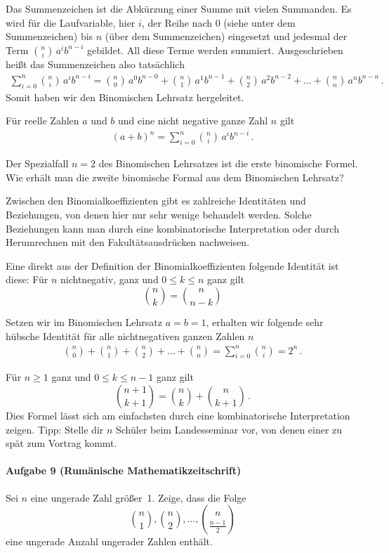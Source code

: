 \documentclass[11pt,a4paper]{article}
\begin{document}
Das Summenzeichen ist die Abkürzung einer Summe mit vielen Summanden. Es wird
für die Laufvariable, hier $i$, der Reihe nach 0 (siehe unter dem
Summenzeichen) bis $n$ (über dem Summenzeichen) eingesetzt und jedesmal der
Term $\binom{n}{i}\,a^{i}b^{n-i}$ gebildet. All diese Terme werden
summiert. Ausgeschrieben heißt das Summenzeichen also tatsächlich
\begin{gather*}
  \sum_{i=0}^{n} \binom{n}{i}\,a^{i}b^{n-i} =\binom{n}{0}\,a^{0}b^{n-0}
  +\binom{n}{1}\,a^{1}b^{n-1} +\binom{n}{2}\,a^{2}b^{n-2} +\dots
  +\binom{n}{n}\,a^{n}b^{n-n}\,.
\end{gather*}
Somit haben wir den Binomischen Lehrsatz hergeleitet.
\begin{satz}
  Für reelle Zahlen $a$ und $b$ und eine nicht negative ganze Zahl $n$
  gilt
  \begin{gather*}
    (a+b)^{n}=\sum_{i=0}^{n} \binom{n}{i}\,a^{i}b^{n-i}\,.
  \end{gather*}
\end{satz}
Der Spezialfall $n=2$ des Binomischen Lehrsatzes ist die erste binomische
Formel.  Wie erhält man die zweite binomische Formal aus dem Binomischen
Lehrsatz?

Zwischen den Binomialkoeffizienten gibt es zahlreiche Identitäten und
Beziehungen, von denen hier nur sehr wenige behandelt werden. Solche
Beziehungen kann man durch eine kombinatorische Interpretation oder durch
Herumrechnen mit den Fakultätsausdrücken nachweisen.

Eine direkt aus der Definition der Binomialkoeffizienten folgende Identität
ist diese: Für $n$ nichtnegativ, ganz und $0\leq k\leq n$ ganz gilt
\[\binom{n}{k}=\binom{n}{n-k}\]

Setzen wir im Binomischen Lehrsatz $a=b=1$, erhalten wir folgende sehr hübsche
Identität für alle nichtnegativen ganzen Zahlen $n$
\begin{gather*}
  \binom{n}{0}+\binom{n}{1}+\binom{n}{2}+\dots +\binom{n}{n}
  =\sum_{i=0}^{n} \binom{n}{i}=2^{n}\,.
\end{gather*}

Für $n\geq 1$ ganz und $0\leq k\leq n-1$ ganz gilt
\[\binom{n+1}{k+1}=\binom{n}{k}+\binom{n}{k+1}\,.\]
Dies Formel lässt sich am einfachsten durch eine kombinatorische
Interpretation zeigen. Tipp: Stelle dir $n$ Schüler beim Landesseminar vor,
von denen einer zu spät zum Vortrag kommt.

\paragraph{Aufgabe 9 (Rumänische Mathematikzeitschrift)} 
Sei $n$ eine ungerade Zahl größer~1. Zeige, dass die Folge
\[\binom{n}{1}, \binom{n}{2}, \dots ,\binom{n}{\frac{n-1}{2}}\]
eine ungerade Anzahl ungerader Zahlen enthält.
\end{document}
